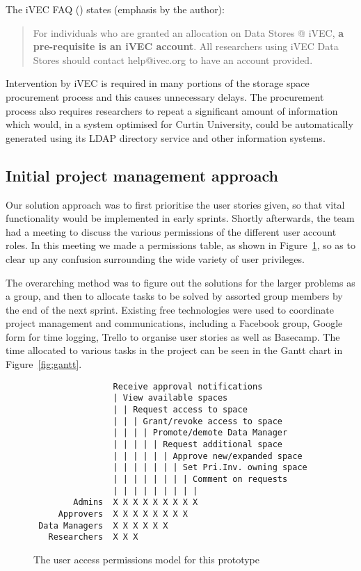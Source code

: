 \documentclass[a4paper,titlepage,12pt]{article}
\begin{document}
The iVEC FAQ (\cite{iVEC2013}) states (emphasis by the author):

\begin{quote}
	For individuals who are granted an allocation on Data Stores @ iVEC,
	\textbf{a pre-requisite is an iVEC account}. All researchers using iVEC
	Data Stores should contact help@ivec.org to have an account provided.
\end{quote}

Intervention by iVEC is required in many portions of the storage space
procurement process and this causes unnecessary delays. The procurement process
also requires researchers to repeat a significant amount of information which
would, in a system optimised for Curtin University, could be automatically
generated using its LDAP directory service and other information systems.

\subsection{Initial project management approach}

Our solution approach was to first prioritise the user stories given, so that
vital functionality would be implemented in early sprints. Shortly afterwards,
the team had a meeting to discuss the various permissions of the different user
account roles. In this meeting we made a permissions table, as shown in
Figure~\ref{fig:permissions}, so as to clear up any confusion surrounding the
wide variety of user privileges.

The overarching method was to figure out the solutions for the larger problems
as a group, and then to allocate tasks to be solved by assorted group members
by the end of the next sprint. Existing free technologies were used to
coordinate project management and communications, including a Facebook group,
Google form for time logging, Trello to organise user stories as well as
Basecamp. The time allocated to various tasks in the project can be seen in the
Gantt chart in Figure~\ref{fig:gantt}.

\begin{figure}[h]
	\caption{The user access permissions model for this prototype}
	\label{fig:permissions}
\begin{lstlisting}
                Receive approval notifications
                | View available spaces
                | | Request access to space
                | | | Grant/revoke access to space
                | | | | Promote/demote Data Manager
                | | | | | Request additional space
                | | | | | | Approve new/expanded space
                | | | | | | | Set Pri.Inv. owning space
                | | | | | | | | Comment on requests
                | | | | | | | | |
        Admins  X X X X X X X X X
     Approvers  X X X X X X X X
 Data Managers  X X X X X X
   Researchers  X X X
\end{lstlisting}
\end{figure}
\end{document}
